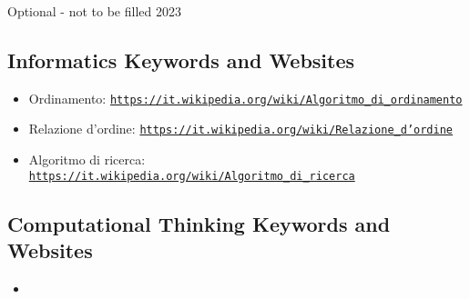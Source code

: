\documentclass[a4paper,11pt]{report}
\newcommand{\BrochureUrlText}[1]{\texttt{#1}}
\begin{document}
Optional - not to be filled 2023


\subsection*{Informatics Keywords and Websites}

\begin{itemize}
  \item Ordinamento: \href{https://it.wikipedia.org/wiki/Algoritmo_di_ordinamento}{\BrochureUrlText{https://it.wikipedia.org/wiki/Algoritmo\_di\_ordinamento}}
  \item Relazione d’ordine: \href{https://it.wikipedia.org/wiki/Relazione_d\%27ordine}{\BrochureUrlText{https://it.wikipedia.org/wiki/Relazione\_d’ordine}}
  \item Algoritmo di ricerca: \href{https://it.wikipedia.org/wiki/Algoritmo_di_ricerca}{\BrochureUrlText{https://it.wikipedia.org/wiki/Algoritmo\_di\_ricerca}}
\end{itemize}


\subsection*{Computational Thinking Keywords and Websites}

\begin{itemize}
  \item 
\end{itemize}
\end{document}
